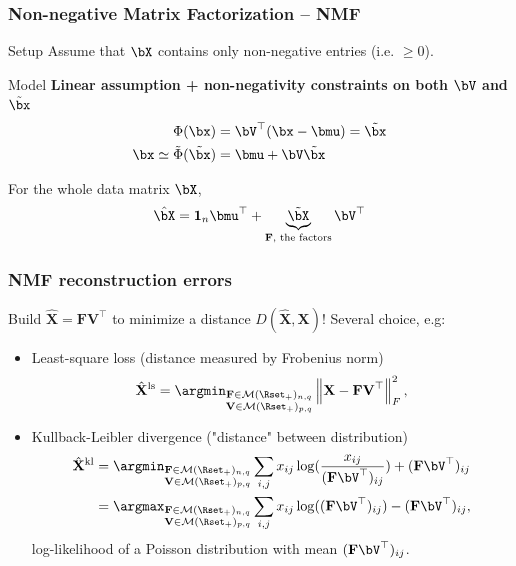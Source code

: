 \documentclass{beamer}\usepackage[]{graphicx}\usepackage[]{color}
\begin{document}
\begin{frame}
  \frametitle{Non-negative Matrix Factorization -- NMF}
  
  \begin{block}{Setup}
  Assume that $\bX$ contains only non-negative entries (i.e. $\geq 0$).
  \end{block}
  
  \begin{block}{Model}
   \alert{\bf Linear assumption + non-negativity constraints on both $\bV$ and $\tilde\bx$}
    \begin{align*}
      \Phi(\bx) & = \bV^\top(\bx-\bmu)  = \tilde\bx \\  
      \bx \simeq \tilde{\Phi}(\tilde\bx) & = \bmu + \bV \tilde\bx
    \end{align*}

  For the whole data matrix $\bX$,
  \[
    \hat{\bX} = \mathbf{1}_n \bmu^\top   + \underbrace{\tilde\bX}_{\mathbf{F}, \text{ the factors}} \bV^\top 
  \]
  \end{block}

\end{frame}

\begin{frame}[fragile]
  \frametitle{NMF reconstruction errors}
  
  Build $\hat{\mathbf{X}} = \mathbf{FV}^\top$ to minimize a distance $D(\hat{\mathbf{X}}, \mathbf{X})$! \alert{Several choice, e.g:}
    \begin{itemize}
    \item Least-square loss (distance measured by Frobenius norm)
    \[ \hat{\mathbf{X}}^{\text{ls}} =  \argmin_{\substack{\mathbf{F}\in\mathcal{M}(\Rset_+)_{n,q}\\\mathbf{V}\in\mathcal{M}(\Rset_+)_{p,q}}} \left\|     \mathbf{X} - \mathbf{FV}^\top \right\|_F^2,
\]
    \item Kullback-Leibler divergence ("distance" between distribution)
    \begin{align*}
    \hat{\mathbf{X}}^{\text{kl}} & =  \argmin_{\substack{\mathbf{F}\in\mathcal{M}(\Rset_+)_{n,q}\\ \mathbf{V}\in\mathcal{M}(\Rset_+)_{p,q}}} \sum_{i,j} x_{ij} \log(\frac{x_{ij}}{(\mathbf{F}\bV^\top)_{ij}}) + (\mathbf{F}\bV^\top)_{ij} \\
    & = \argmax_{\substack{\mathbf{F}\in\mathcal{M}(\Rset_+)_{n,q}\\ \mathbf{V}\in\mathcal{M}(\Rset_+)_{p,q}}} \sum_{i,j} x_{ij} \log((\mathbf{F}\bV^\top)_{ij}) - (\mathbf{F}\bV^\top)_{ij},\\
    \end{align*}
    \rsa log-likelihood of a Poisson distribution with mean $(\mathbf{F}\bV^\top)_{ij}$.
    \end{itemize}
\end{frame}
\end{document}

